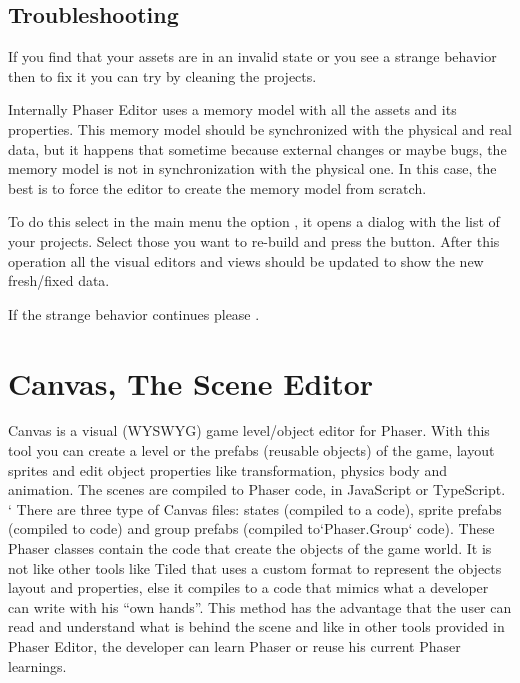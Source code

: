 \documentclass[letterpaper,10pt,english]{sphinxmanual}
\begin{document}
\section{Troubleshooting}
\label{\detokenize{assets_manager:troubleshooting}}
If you find that your assets are in an invalid state or you see a strange behavior then to fix it you can try by cleaning the projects.

Internally Phaser Editor uses a memory model with all the assets and its properties. This memory model should be synchronized with the physical and real data, but it happens that sometime because external changes or maybe bugs, the memory model is not in synchronization with the physical one. In this case, the best is to force the editor to create the memory model from scratch.

To do this select in the main menu the option , it opens a dialog with the list of your projects. Select those you want to re-build and press the  button. After this operation all the visual editors and views should be updated to show the new fresh/fixed data.

\noindent{}

If the strange behavior continues please .


\chapter{Canvas, The Scene Editor}
\label{\detokenize{canvas:canvas-the-scene-editor}}\label{\detokenize{canvas::doc}}
Canvas is a visual (WYSWYG) game level/object editor for Phaser. With this tool you can create a level or the prefabs (reusable objects) of the game, layout sprites and edit object properties like transformation, physics body and animation. The scenes are compiled to Phaser code, in JavaScript or TypeScript.
{}`
There are three type of Canvas files: states (compiled to a  code), sprite prefabs (compiled to  code) and group prefabs (compiled to{}`Phaser.Group{}` code). These Phaser classes contain the code that create the objects of the game world. It is not like other tools like Tiled that uses a custom format to represent the objects layout and properties, else it compiles to a code that mimics what a developer can write with his “own hands”. This method has the advantage that the user can read and understand what is behind the scene and like in other tools provided in Phaser Editor, the developer can learn Phaser or reuse his current Phaser learnings.
\end{document}
